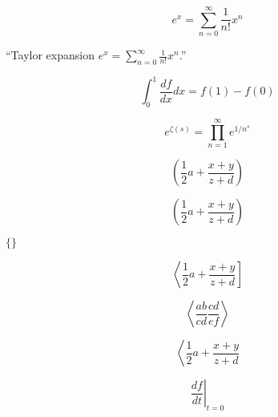 \documentclass[letterpaper,notitlepage,11pt]{article}
\begin{document}
\[ e^x=\sum^\infty_{n=0} \frac1{n!}x^n \]

``Taylor expansion $e^x=\sum_{n=0}^\infty \frac1{n!}x^n$.''

\begin{equation}
\int^1_0 \frac{df}{dx}dx = f(1) - f(0)
\end{equation}

\begin{equation}
e^{\zeta(s)} = \prod^\infty_{n=1} e^{1/n^s}
\end{equation}

\newpage

\begin{equation}
(\frac12 a+\frac{x+y}{z+d})
\end{equation}

\begin{equation}
\left(\frac12 a+\frac{x+y}{z+d}\right)
\end{equation}

$\{ \}$

\begin{equation}
\left\langle\frac12 a+\frac{x+y}{z+d}\right]
\end{equation}

\begin{equation}
\left\langle\frac{ab}{cd} \frac{cd}{ef}\right\rangle
\end{equation}

\begin{equation}
\left\langle\frac12 a+\frac{x+y}{z+d}\right.
\end{equation}

\begin{equation}
\left. \frac{df}{dt} \right|_{t=0}
\end{equation}
\end{document}
